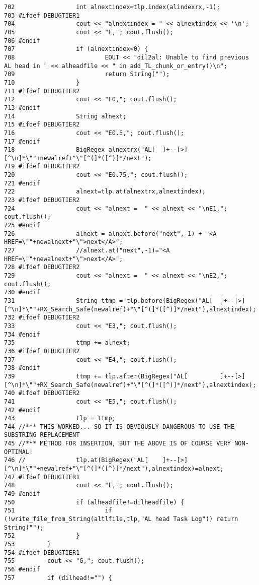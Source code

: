 \begin{verbatim}
702                 int alnextindex=tlp.index(alindexrx,-1);
703 #ifdef DEBUGTIER1
704                 cout << "alnextindex = " << alnextindex << '\n';
705                 cout << "E,"; cout.flush();
706 #endif
707                 if (alnextindex<0) {
708                         EOUT << "dil2al: Unable to find previous AL head in " << alheadfile << " in add_TL_chunk_or_entry()\n";
709                         return String("");
710                 }
711 #ifdef DEBUGTIER2
712                 cout << "E0,"; cout.flush();
713 #endif
714                 String alnext;
715 #ifdef DEBUGTIER2
716                 cout << "E0.5,"; cout.flush();
717 #endif
718                 BigRegex alnextrx("AL[  ]+--[>][^\n]*\""+newalref+"\"[^(]*([^)]*/next");
719 #ifdef DEBUGTIER2
720                 cout << "E0.75,"; cout.flush();
721 #endif
722                 alnext=tlp.at(alnextrx,alnextindex);
723 #ifdef DEBUGTIER2
724                 cout << "alnext =  " << alnext << "\nE1,"; cout.flush();                
725 #endif
726                 alnext = alnext.before("next",-1) + "<A HREF=\""+newalnext+"\">next</A>";
727                 //alnext.at("next",-1)="<A HREF=\""+newalnext+"\">next</A>";
728 #ifdef DEBUGTIER2
729                 cout << "alnext =  " << alnext << "\nE2,"; cout.flush();                
730 #endif
731                 String ttmp = tlp.before(BigRegex("AL[  ]+--[>][^\n]*\""+RX_Search_Safe(newalref)+"\"[^(]*([^)]*/next"),alnextindex);
732 #ifdef DEBUGTIER2
733                 cout << "E3,"; cout.flush();            
734 #endif
735                 ttmp += alnext;
736 #ifdef DEBUGTIER2
737                 cout << "E4,"; cout.flush();            
738 #endif
739                 ttmp += tlp.after(BigRegex("AL[         ]+--[>][^\n]*\""+RX_Search_Safe(newalref)+"\"[^(]*([^)]*/next"),alnextindex);
740 #ifdef DEBUGTIER2
741                 cout << "E5,"; cout.flush();            
742 #endif
743                 tlp = ttmp;
744 //*** THIS WORKED... SO IT IS OBVIOUSLY DANGEROUS TO USE THE SUBSTRING REPLACEMENT
745 //*** METHOD FOR INSERTION, BUT THE ABOVE IS OF COURSE VERY NON-OPTIMAL!
746 //              tlp.at(BigRegex("AL[    ]+--[>][^\n]*\""+newalref+"\"[^(]*([^)]*/next"),alnextindex)=alnext;
747 #ifdef DEBUGTIER1
748                 cout << "F,"; cout.flush();
749 #endif
750                 if (alheadfile!=dilheadfile) {
751                         if (!write_file_from_String(altlfile,tlp,"AL head Task Log")) return String("");
752                 }
753         }
754 #ifdef DEBUGTIER1
755         cout << "G,"; cout.flush();
756 #endif
757         if (dilhead!="") {

\end{verbatim}
